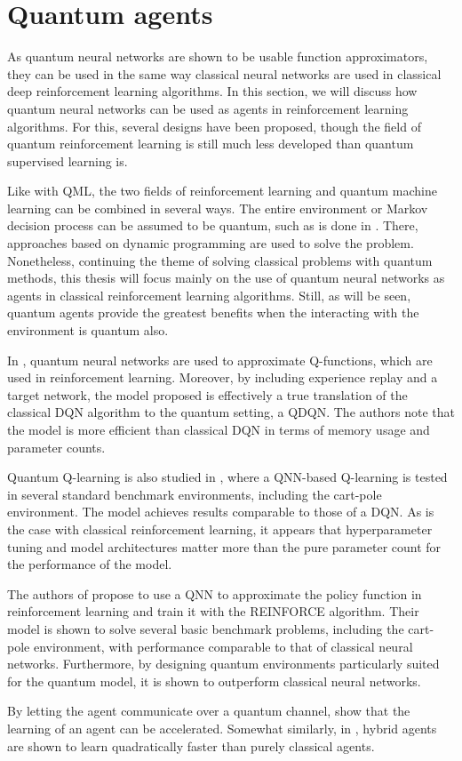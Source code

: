 \section{Quantum agents}
\label{sec:quantum_agents}

As quantum neural networks are shown to be usable function approximators, they can be used in the same way classical neural networks are used in classical deep reinforcement learning algorithms.
In this section, we will discuss how quantum neural networks can be used as agents in reinforcement learning algorithms.
For this, several designs have been proposed, though the field of quantum reinforcement learning is still much less developed than quantum supervised learning is.

Like with QML, the two fields of reinforcement learning and quantum machine learning can be combined in several ways.
The entire environment or Markov decision process can be assumed to be quantum, such as is done in \autocite{ying2021}.
There, approaches based on dynamic programming are used to solve the problem.
Nonetheless, continuing the theme of solving classical problems with quantum methods, this thesis will focus mainly on the use of quantum neural networks as agents in classical reinforcement learning algorithms.
Still, as will be seen, quantum agents provide the greatest benefits when the interacting with the environment is quantum also.

In \autocite{chen2020}, quantum neural networks are used to approximate Q-functions, which are used in reinforcement learning.
Moreover, by including experience replay and a target network, the model proposed is effectively a true translation of the classical DQN algorithm to the quantum setting, a QDQN.
The authors note that the model is more efficient than classical DQN in terms of memory usage and parameter counts.

Quantum Q-learning is also studied in \autocite{skolik2022}, where a QNN-based Q-learning is tested in several standard benchmark environments, including the cart-pole environment.
The model achieves results comparable to those of a DQN.
As is the case with classical reinforcement learning, it appears that hyperparameter tuning and model architectures matter more than the pure parameter count for the performance of the model.

The authors of \autocite{jerbi2021} propose to use a QNN to approximate the policy function in reinforcement learning and train it with the REINFORCE algorithm.
Their model is shown to solve several basic benchmark problems, including the cart-pole environment, with performance comparable to that of classical neural networks.
Furthermore, by designing quantum environments particularly suited for the quantum model, it is shown to outperform classical neural networks.

By letting the agent communicate over a quantum channel, \autocite{saggio2021} show that the learning of an agent can be accelerated.
Somewhat similarly, in \autocite{hamann2022}, hybrid agents are shown to learn quadratically faster than purely classical agents.